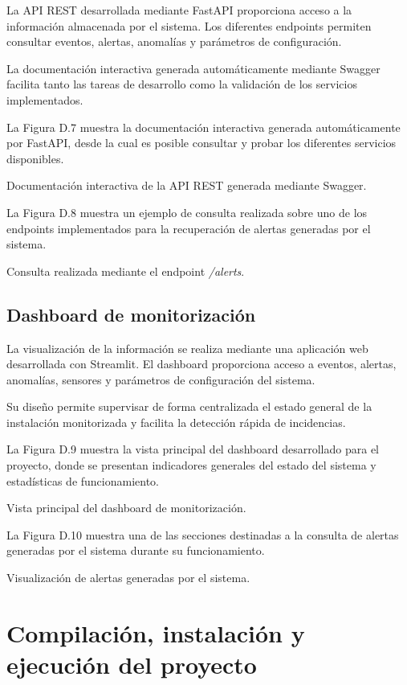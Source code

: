 La API REST desarrollada mediante FastAPI proporciona acceso a la información almacenada por el sistema. Los diferentes endpoints permiten consultar eventos, alertas, anomalías y parámetros de configuración.

La documentación interactiva generada automáticamente mediante Swagger facilita tanto las tareas de desarrollo como la validación de los servicios implementados.

La Figura D.7 muestra la documentación interactiva generada automáticamente por FastAPI, desde la cual es posible consultar y probar los diferentes servicios disponibles.

{Documentación interactiva de la API REST generada mediante Swagger.}

La Figura D.8 muestra un ejemplo de consulta realizada sobre uno de los endpoints implementados para la recuperación de alertas generadas por el sistema.

{Consulta realizada mediante el endpoint \textit{/alerts}.}

\subsection{Dashboard de monitorización}

La visualización de la información se realiza mediante una aplicación web desarrollada con Streamlit. El dashboard proporciona acceso a eventos, alertas, anomalías, sensores y parámetros de configuración del sistema.

Su diseño permite supervisar de forma centralizada el estado general de la instalación monitorizada y facilita la detección rápida de incidencias.

La Figura D.9 muestra la vista principal del dashboard desarrollado para el proyecto, donde se presentan indicadores generales del estado del sistema y estadísticas de funcionamiento.

{Vista principal del dashboard de monitorización.}

La Figura D.10 muestra una de las secciones destinadas a la consulta de alertas generadas por el sistema durante su funcionamiento.

{Visualización de alertas generadas por el sistema.}


\section{Compilación, instalación y ejecución del proyecto}

